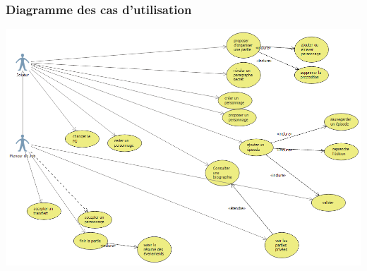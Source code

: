 \documentclass[a4paper, 11pt, titlepage]{article}
\begin{document}
\subsubsection{Diagramme des cas d'utilisation}

\begin{center}
    \includegraphics[scale=0.7,angle=90]{analyse/usecases}
\end{center}
\end{document}
